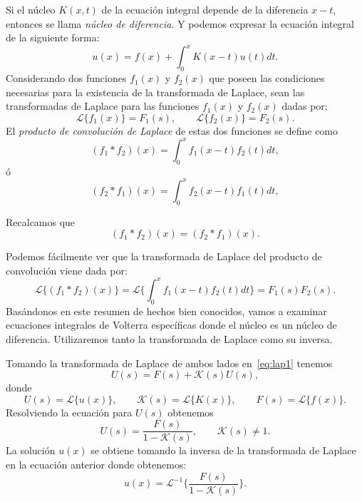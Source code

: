 Si el núcleo $K(x,t)$ de la ecuación integral depende de la diferencia $x - t$, entonces se llama \textit{núcleo de diferencia}. Y podemos expresar la ecuación integral de la siguiente forma:
\begin{equation}\label{eq:lap1}
	u(x) = f(x) + \int_0^x K(x - t)u(t)dt.
\end{equation}
Considerando dos funciones $f_1(x)$ y $f_2(x)$ que poseen las condiciones necesarias para la existencia de la transformada de Laplace, sean las transformadas de Laplace para las funciones $f_1(x)$ y $f_2(x)$ dadas por:
\begin{equation}
	\mathcal{L}\{f_1(x)\} = F_1(s), \qquad \mathcal{L}\{f_2(x)\} = F_2(s).
\end{equation}
El \textit{producto de convolución de Laplace} de estas dos funciones se define como
\begin{equation}
	(f_1 \ast f_2)(x) = \int_{0}^{x} f_1(x-t)f_2(t)dt,
\end{equation}
ó
\begin{equation}
	(f_2 \ast f_1)(x) = \int_{0}^{x} f_2(x-t)f_1(t)dt,
\end{equation}
\begin{observacion}
	Recalcamos que
	\begin{equation}
		(f_1 \ast f_2)(x) = (f_2 \ast f_1)(x).
	\end{equation}
\end{observacion}
Podemos fácilmente ver que la transformada de Laplace del producto de convolución viene dada por:
\begin{equation}
	\mathcal{L}\{(f_1 \ast f_2)(x)\} = \mathcal{L}\{\int_{0}^{x}f_1(x-t)f_2(t)dt\} = F_1(s)F_2(s).
\end{equation}
Basándonos en este resumen de hechos bien conocidos, vamos a examinar ecuaciones integrales de Volterra específicas donde el núcleo es un núcleo de diferencia. Utilizaremos tanto la transformada de Laplace como su inversa.

Tomando la transformada de Laplace de ambos lados en~\eqref{eq:lap1} tenemos
\begin{equation}
	U(s) = F(s) + \mathcal{K}(s)U(s),
\end{equation}
donde
\begin{equation}
	U(s) = \mathcal{L}\{u(x)\}, \qquad \mathcal{K}(s) = \mathcal{L}\{K(x)\}, \qquad F(s) = \mathcal{L}\{f(x)\}.
\end{equation}
Resolviendo la ecuación para $U(s)$ obtenemos
\begin{equation}
	U(s) = \dfrac{F(s)}{1- \mathcal{K}(s)}, \qquad \mathcal{K}(s) \neq 1.
\end{equation}
La solución $u(x)$ se obtiene tomando la inversa de la transformada de Laplace en la ecuación anterior donde obtenemos:
\begin{equation}
	u(x) = \mathcal{L}^{-1}\{\dfrac{F(s)}{1- \mathcal{K}(s)}\}.
\end{equation}

